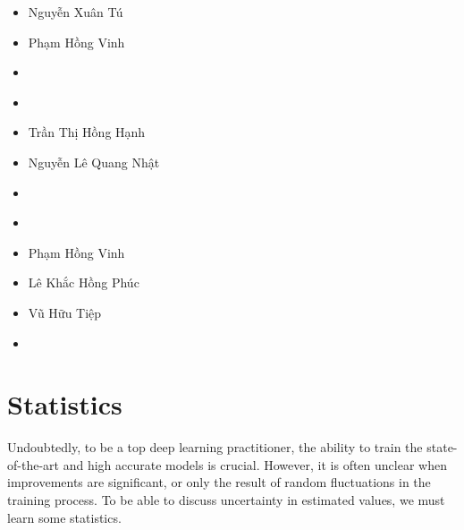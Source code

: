 \documentclass[letterpaper,11pt,english]{sphinxmanual}
\begin{document}
\begin{itemize}
\item {} 
Nguyễn Xuân Tú

\end{itemize}


\begin{itemize}
\item {} 
Phạm Hồng Vinh

\end{itemize}


\begin{itemize}
\item {} 
\end{itemize}


\begin{itemize}
\item {} 
\end{itemize}


\begin{itemize}
\item {} 
Trần Thị Hồng Hạnh

\end{itemize}


\begin{itemize}
\item {} 
Nguyễn Lê Quang Nhật

\end{itemize}


\begin{itemize}
\item {} 
\end{itemize}


\begin{itemize}
\item {} 
\end{itemize}


\begin{itemize}
\item {} 
Phạm Hồng Vinh

\item {} 
Lê Khắc Hồng Phúc

\item {} 
Vũ Hữu Tiệp

\end{itemize}


\begin{itemize}
\item {} 
\end{itemize}


\section{Statistics}
\label{\detokenize{chapter_appendix_math/statistics:statistics}}\label{\detokenize{chapter_appendix_math/statistics:sec-statistics}}\label{\detokenize{chapter_appendix_math/statistics::doc}}
Undoubtedly, to be a top deep learning practitioner, the ability to
train the state-of-the-art and high accurate models is crucial. However,
it is often unclear when improvements are significant, or only the
result of random fluctuations in the training process. To be able to
discuss uncertainty in estimated values, we must learn some statistics.
\end{document}
